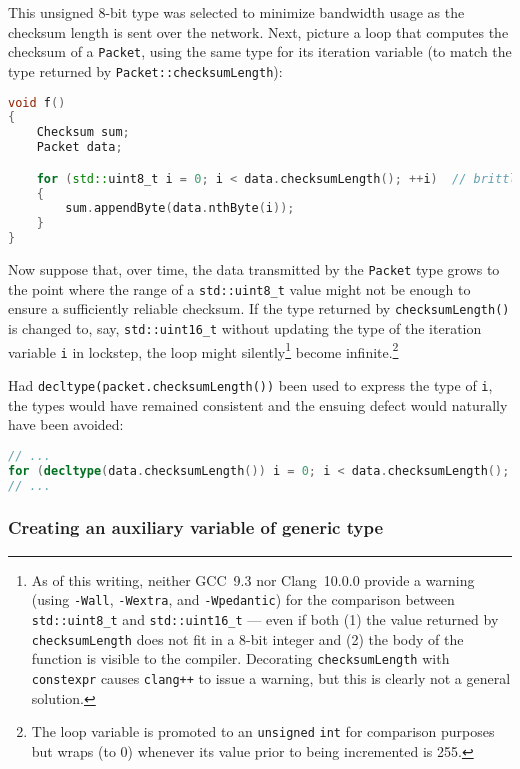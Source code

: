 \noindent This unsigned 8-bit type was selected to minimize bandwidth usage
as the checksum length is sent over the network. Next, picture a loop
that computes the checksum of a \lstinline!Packet!, using the same type for its iteration variable (to match the
type returned by \lstinline!Packet::checksumLength!):

\begin{lstlisting}[language=C++]
void f()
{
    Checksum sum;
    Packet data;

    for (std::uint8_t i = 0; i < data.checksumLength(); ++i)  // brittle
    {
        sum.appendByte(data.nthByte(i));
    }
}
\end{lstlisting}
    

Now suppose that, over time, the data transmitted by the \lstinline!Packet!
type grows to the point where the range of a \lstinline!std::uint8_t!
value might not be enough to ensure a sufficiently reliable checksum. If
the type returned by \lstinline!checksumLength()! is changed to, say,
\lstinline!std::uint16_t! without updating the type of the iteration
variable \lstinline!i! in lockstep, the loop might
silently{\cprotect\footnote{As of this writing, neither
GCC~9.3 nor Clang~10.0.0 provide
a warning (using \lstinline!-Wall!, \lstinline!-Wextra!, and
\lstinline!-Wpedantic!) for the comparison between \lstinline!std::uint8_t!
and \lstinline!std::uint16_t! --- even if both (1) the value returned by
\lstinline!checksumLength! does not fit in a 8-bit integer and (2) the
body of the function is visible to the compiler. Decorating
\lstinline!checksumLength! with \lstinline!constexpr! causes
\lstinline!clang++! to issue a warning, but this is clearly not a general
solution.}} become infinite.{\cprotect\footnote{The loop
variable is promoted to an \lstinline!unsigned! \lstinline!int! for
comparison purposes but wraps (to 0) whenever its value prior to
  being incremented is 255.}}

Had \lstinline!decltype(packet.checksumLength())! been used to express the
type of \lstinline!i!, the types would have remained consistent and the
ensuing defect would naturally have been avoided:

\begin{lstlisting}[language=C++]
// ...
for (decltype(data.checksumLength()) i = 0; i < data.checksumLength(); ++i)
// ...
\end{lstlisting}
    

\subsubsection[Creating an auxiliary variable of generic type]{Creating an auxiliary variable of generic type}\label{creating-an-auxiliary-variable-of-generic-type}

